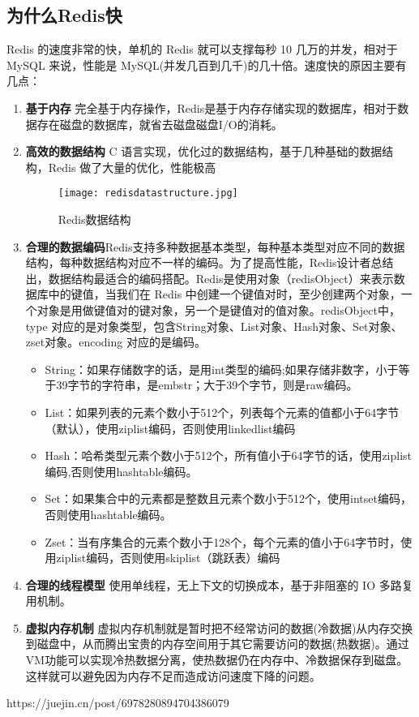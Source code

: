 \documentclass[../../../interview-questions.tex]{subfiles}
\begin{document}
\subsection{为什么Redis快}

Redis 的速度非常的快，单机的 Redis 就可以支撑每秒 10 几万的并发，相对于 MySQL 来说，性能是 MySQL(并发几百到几千)的几十倍。速度快的原因主要有几点：

\begin{enumerate}
    \item {\bf{基于内存}} 完全基于内存操作，Redis是基于内存存储实现的数据库，相对于数据存在磁盘的数据库，就省去磁盘磁盘I/O的消耗。
    \item {\bf{高效的数据结构}} C 语言实现，优化过的数据结构，基于几种基础的数据结构，Redis 做了大量的优化，性能极高

\begin{figure}[htbp]
    \centering
    \texttt{[image: redisdatastructure.jpg]}
    \caption{Redis数据结构}
    \label{fig:redisdatastructure}
\end{figure}

    \item {\bf{合理的数据编码}}Redis支持多种数据基本类型，每种基本类型对应不同的数据结构，每种数据结构对应不一样的编码。为了提高性能，Redis设计者总结出，数据结构最适合的编码搭配。Redis是使用对象（redisObject）来表示数据库中的键值，当我们在 Redis 中创建一个键值对时，至少创建两个对象，一个对象是用做键值对的键对象，另一个是键值对的值对象。redisObject中，type 对应的是对象类型，包含String对象、List对象、Hash对象、Set对象、zset对象。encoding 对应的是编码。

    \begin{itemize}
        \item {String：如果存储数字的话，是用int类型的编码;如果存储非数字，小于等于39字节的字符串，是embstr；大于39个字节，则是raw编码。}
        \item {List：如果列表的元素个数小于512个，列表每个元素的值都小于64字节（默认），使用ziplist编码，否则使用linkedlist编码}
        \item {Hash：哈希类型元素个数小于512个，所有值小于64字节的话，使用ziplist编码,否则使用hashtable编码。}
        \item {Set：如果集合中的元素都是整数且元素个数小于512个，使用intset编码，否则使用hashtable编码。}
        \item {Zset：当有序集合的元素个数小于128个，每个元素的值小于64字节时，使用ziplist编码，否则使用skiplist（跳跃表）编码}
    \end{itemize}
    
    \item {\bf{合理的线程模型}} 使用单线程，无上下文的切换成本，基于非阻塞的 IO 多路复用机制。
    \item {\bf{虚拟内存机制}} 虚拟内存机制就是暂时把不经常访问的数据(冷数据)从内存交换到磁盘中，从而腾出宝贵的内存空间用于其它需要访问的数据(热数据)。通过VM功能可以实现冷热数据分离，使热数据仍在内存中、冷数据保存到磁盘。这样就可以避免因为内存不足而造成访问速度下降的问题。
\end{enumerate}

https://juejin.cn/post/6978280894704386079
\end{document}
